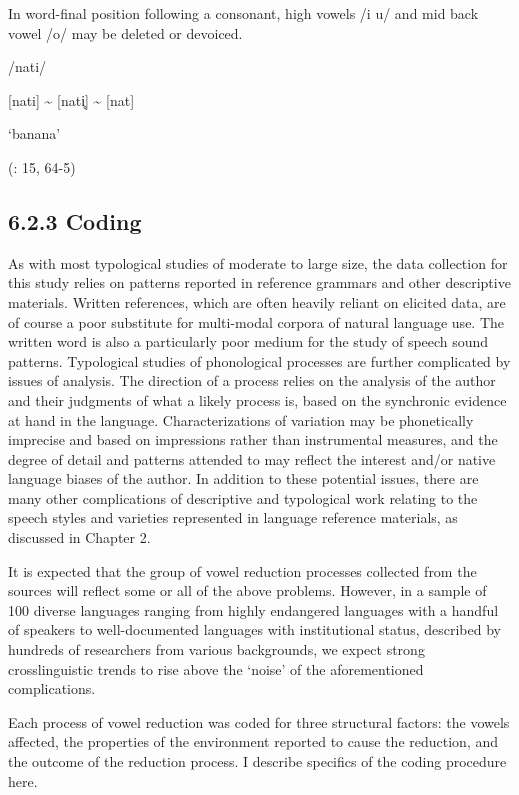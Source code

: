 In word-final position following a consonant, high vowels /i u/ and mid back vowel /o/ may be deleted or devoiced.

/nati/

[nati] {\textasciitilde} [nati̥] {\textasciitilde} [nat]

‘banana’

(\citealt{Lacrampe2014}: 15, 64-5)

\z

\subsection{6.2.3 Coding}

  As with most typological studies of moderate to large size, the data collection for this study relies on patterns reported in reference grammars and other descriptive materials. Written references, which are often heavily reliant on elicited data, are of course a poor substitute for multi-modal corpora of natural language use. The written word is also a particularly poor medium for the study of speech sound patterns. Typological studies of phonological processes are further complicated by issues of analysis. The direction of a process relies on the analysis of the author and their judgments of what a likely process is, based on the synchronic evidence at hand in the language. Characterizations of variation may be phonetically imprecise and based on impressions rather than instrumental measures, and the degree of detail and patterns attended to may reflect the interest and/or native language biases of the author. In addition to these potential issues, there are many other complications of descriptive and typological work relating to the speech styles and varieties represented in language reference materials, as discussed in Chapter 2.

  It is expected that the group of vowel reduction processes collected from the sources will reflect some or all of the above problems. However, in a sample of 100 diverse languages ranging from highly endangered languages with a handful of speakers to well-documented languages with institutional status, described by hundreds of researchers from various backgrounds, we expect strong crosslinguistic trends to rise above the ‘noise’ of the aforementioned complications.

  Each process of vowel reduction was coded for three structural factors: the vowels affected, the properties of the environment reported to cause the reduction, and the outcome of the reduction process. I describe specifics of the coding procedure here.

